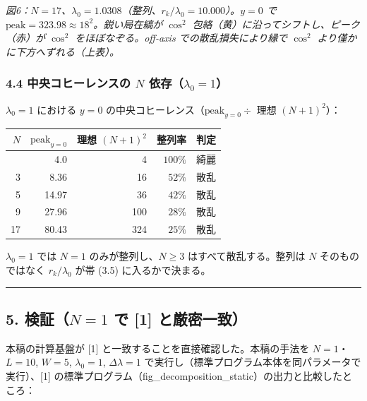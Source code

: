 \documentclass[
]{ltjsarticle}
\newcounter{none} %
\begin{document}
\emph{図6：\(N=17\)、\(\lambda_0=1.0308\)（整列、\(r_k/\lambda_0=10.000\)）。\(y=0\)
で \(\mathrm{peak}=323.98\approx18^2\)。鋭い局在縞が \(\cos^2\)
包絡（黄）に沿ってシフトし、ピーク（赤）が \(\cos^2\)
をほぼなぞる。off-axis での散乱損失により縁で \(\cos^2\)
より僅かに下方へずれる（上表）。}

\subsubsection{\texorpdfstring{4.4 中央コヒーレンスの \(N\)
依存（\(\lambda_0=1\)）}{4.4 中央コヒーレンスの N 依存（\textbackslash lambda\_0=1）}}\label{ux4e2dux592eux30b3ux30d2ux30fcux30ecux30f3ux30b9ux306e-n-ux4f9dux5b58lambda_01}

\(\lambda_0=1\) における \(y=0\)
の中央コヒーレンス（\(\mathrm{peak}_{y=0}\div\) 理想 \((N+1)^2\)）：

{\def\LTcaptype{none} %
\begin{longtable}[]{@{}rrrrl@{}}
\toprule\noalign{}
\(N\) & \(\mathrm{peak}_{y=0}\) & 理想 \((N+1)^2\) & 整列率 & 判定 \\
\midrule\noalign{}
\endhead
\bottomrule\noalign{}
\endlastfoot
1 & 4.0 & 4 & \(100\%\) & 綺麗 \\
3 & 8.36 & 16 & \(52\%\) & 散乱 \\
5 & 14.97 & 36 & \(42\%\) & 散乱 \\
9 & 27.96 & 100 & \(28\%\) & 散乱 \\
17 & 80.43 & 324 & \(25\%\) & 散乱 \\
\end{longtable}
}

\(\lambda_0=1\) では \(N=1\) のみが整列し、\(N\ge3\)
はすべて散乱する。整列は \(N\) そのものではなく \(r_k/\lambda_0\) が帯
(3.5) に入るかで決まる。

\begin{center}\rule{0.5\linewidth}{0.5pt}\end{center}

\subsection{\texorpdfstring{5. 検証（\(N=1\) で {[}1{]}
と厳密一致）}{5. 検証（N=1 で {[}1{]} と厳密一致）}}\label{ux691cux8a3cn1-ux3067-1-ux3068ux53b3ux5bc6ux4e00ux81f4}

本稿の計算基盤が {[}1{]} と一致することを直接確認した。本稿の手法を
\(N=1\)・\(L=10\), \(W=5\), \(\lambda_0=1\), \(\Delta\lambda=1\)
で実行し（標準プログラム本体を同パラメータで実行）、{[}1{]}
の標準プログラム（fig\_decomposition\_static）の出力と比較したところ：
\end{document}
